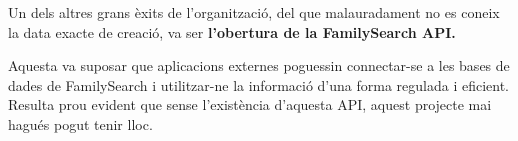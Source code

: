     Un dels altres grans èxits de  l’organització, del que malauradament no es coneix la data exacte de creació, va ser \textbf{l’obertura de la FamilySearch \gls{API}.}

    Aquesta va suposar que aplicacions externes poguessin connectar-se a les bases de dades de FamilySearch i utilitzar-ne la informació d'una forma regulada i eficient. Resulta prou evident que sense l'existència d'aquesta \gls{API}, aquest projecte mai hagués pogut tenir lloc.
